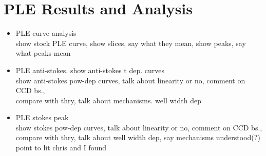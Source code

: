 \section{PLE Results and Analysis}
\begin{itemize}
\item PLE curve analysis\\
show stock PLE curve, show slices, say what they mean, show peaks, say what peaks mean
\item PLE anti-stokes.
show anti-stokes t dep. curves\\
show anti-stokes pow-dep curves, talk about linearity or no, comment on CCD bs., \\
compare with thry, talk about mechanisms. well width dep
\item PLE stokes peak\\
show stokes pow-dep curves, talk about linearity or no, comment on CCD bs., \\
compare with thry, talk about well width dep, say mechanisms understood(?) point to lit chris and I found

\end{itemize}
